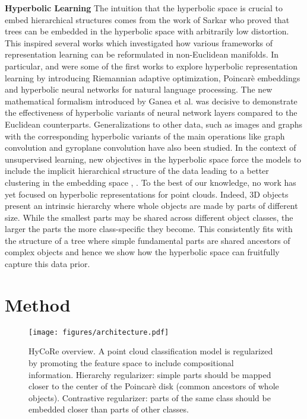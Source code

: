 \documentclass{article}
\begin{document}
\textbf{Hyperbolic Learning} The intuition that the hyperbolic space is crucial to embed hierarchical structures comes from the work of Sarkar \cite{sarkar2011low} who proved that trees can be embedded in the hyperbolic space with arbitrarily low distortion. This inspired several works which investigated how various frameworks of representation learning can be reformulated in non-Euclidean manifolds. In particular, \cite{nickel2017poincare} \cite{becigneul2018riemannian} and \cite{ganea2018hyperbolic} were some of the first works to explore hyperbolic representation learning by introducing Riemannian adaptive optimization, Poincarè embeddings and hyperbolic neural networks for natural language processing. The new mathematical formalism introduced by Ganea et al. \cite{ganea2018hyperbolic} was decisive to demonstrate the effectiveness of hyperbolic variants of neural network layers compared to the Euclidean counterparts. 
Generalizations to other data, such as images \cite{khrulkov2020hyperbolic} and graphs \cite{ying2018graph} with the corresponding hyperbolic variants of the main operations like graph convolution \cite{ying2018graph} and gyroplane convolution \cite{hsu2021capturing} have also been studied.
In the context of unsupervised learning, new objectives in the hyperbolic space force the models to include the implicit hierarchical structure of the data leading to a better clustering in the embedding space \cite{hsu2021capturing}, \cite{weng2021unsupervised}.
To the best of our knowledge, no work has yet focused on hyperbolic representations for point clouds. Indeed, 3D objects present an intrinsic hierarchy where whole objects are made by parts of different size. While the smallest parts may be shared across different object classes, the larger the parts the more class-specific they become. This consistently fits with the structure of a tree where simple fundamental parts are shared ancestors of complex objects and hence we show how the hyperbolic space can fruitfully capture this data prior. 



\section{Method} 

\begin{figure}
  \centering
    \texttt{[image: figures/architecture.pdf]}
  \caption{HyCoRe overview. A point cloud classification model is regularized by promoting the feature space to include compositional information. Hierarchy regularizer: simple parts should be mapped closer to the center of the Poincarè disk (common ancestors of whole objects). Contrastive regularizer: parts of the same class should be embedded closer than parts of other classes. }
  \label{fig:arch}
\end{figure}
\end{document}
